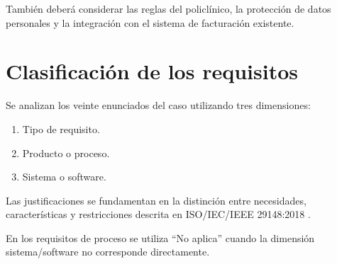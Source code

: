 \documentclass[12pt,a4paper]{article}
\begin{document}
También deberá considerar las reglas del
policlínico, la protección de datos personales
y la integración con el sistema de facturación
existente.

\section{Clasificación de los requisitos}

Se analizan los veinte enunciados del caso
utilizando tres dimensiones:

\begin{enumerate}
\item Tipo de requisito.
\item Producto o proceso.
\item Sistema o software.
\end{enumerate}

Las justificaciones se fundamentan en la
distinción entre necesidades, características
y restricciones descrita en
ISO/IEC/IEEE 29148:2018 \cite{iso29148}.

En los requisitos de proceso se utiliza
``No aplica'' cuando la dimensión
sistema/software no corresponde directamente.

\end{document}
